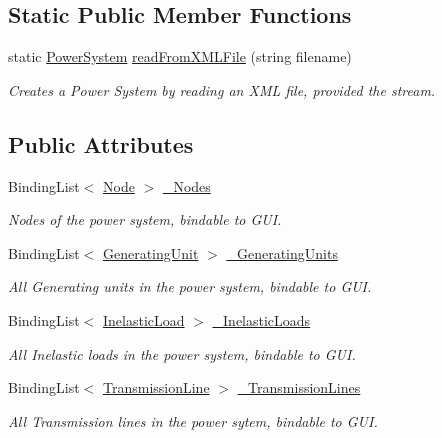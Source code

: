 \subsection*{Static Public Member Functions}
\begin{DoxyCompactItemize}
\item 
static \hyperlink{class_power_system_planning_1_1_power_system}{Power\+System} \hyperlink{class_power_system_planning_1_1_power_system_a6e4503f2559b1073a140555ecd6093b0}{read\+From\+X\+M\+L\+File} (string filename)
\begin{DoxyCompactList}\small\item\em Creates a Power System by reading an X\+ML file, provided the stream. \end{DoxyCompactList}\end{DoxyCompactItemize}
\subsection*{Public Attributes}
\begin{DoxyCompactItemize}
\item 
Binding\+List$<$ \hyperlink{class_power_system_planning_1_1_node}{Node} $>$ \hyperlink{class_power_system_planning_1_1_power_system_afe8041cf92b81053ffc54c1ab2cd76cc}{\+\_\+\+Nodes}
\begin{DoxyCompactList}\small\item\em Nodes of the power system, bindable to G\+UI. \end{DoxyCompactList}\item 
Binding\+List$<$ \hyperlink{class_power_system_planning_1_1_generating_unit}{Generating\+Unit} $>$ \hyperlink{class_power_system_planning_1_1_power_system_af58aafa6a09ec68a492ea650e587ee36}{\+\_\+\+Generating\+Units}
\begin{DoxyCompactList}\small\item\em All Generating units in the power system, bindable to G\+UI. \end{DoxyCompactList}\item 
Binding\+List$<$ \hyperlink{class_power_system_planning_1_1_inelastic_load}{Inelastic\+Load} $>$ \hyperlink{class_power_system_planning_1_1_power_system_a00de0d9b9439f8b3ec25b1ac020a503d}{\+\_\+\+Inelastic\+Loads}
\begin{DoxyCompactList}\small\item\em All Inelastic loads in the power system, bindable to G\+UI. \end{DoxyCompactList}\item 
Binding\+List$<$ \hyperlink{class_power_system_planning_1_1_transmission_line}{Transmission\+Line} $>$ \hyperlink{class_power_system_planning_1_1_power_system_a88e97e6852c0105b86408ff9753163ba}{\+\_\+\+Transmission\+Lines}
\begin{DoxyCompactList}\small\item\em All Transmission lines in the power sytem, bindable to G\+UI. \end{DoxyCompactList}\end{DoxyCompactItemize}
